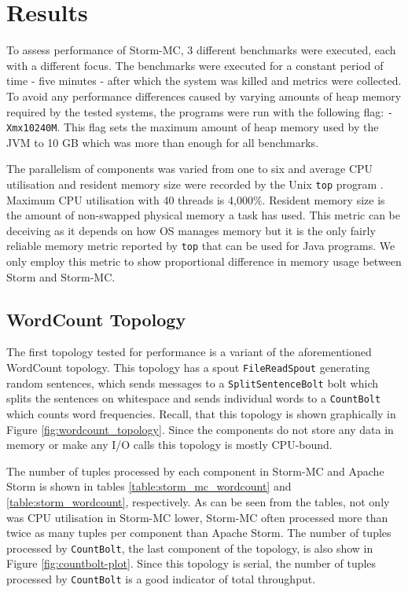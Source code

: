 \documentclass[bsc,logo,frontabs,twoside,singlespacing,normalheadings,parskip]{infthesis}\usepackage[]{graphicx}\usepackage[]{color}
\begin{document}
\section{Results}
\label{sec:performance}

To assess performance of Storm-MC, 3 different benchmarks were executed, each with a different focus. The benchmarks were executed for a constant period of time - five minutes - after which the system was killed and metrics were collected. To avoid any performance differences caused by varying amounts of heap memory required by the tested systems, the programs were run with the following flag: \texttt{-Xmx10240M}. This flag sets the maximum amount of heap memory used by the JVM to 10 GB which was more than enough for all benchmarks.

The parallelism of components was varied from one to six and average CPU utilisation and resident memory size were recorded by the Unix \texttt{top} program \citep{UnixTop}. Maximum CPU utilisation with 40 threads is 4,000\%. Resident memory size is the amount of non-swapped physical memory a task has used. This metric can be deceiving as it depends on how OS manages memory but it is the only fairly reliable memory metric reported by \texttt{top} that can be used for Java programs. We only employ this metric to show proportional difference in memory usage between Storm and Storm-MC.

\subsection{WordCount Topology}

The first topology tested for performance is a variant of the aforementioned WordCount topology. This topology has a spout \texttt{FileReadSpout} generating random sentences, which sends messages to a \texttt{SplitSentenceBolt} bolt which splits the sentences on whitespace and sends individual words to a \texttt{CountBolt} which counts word frequencies. Recall, that this topology is shown graphically in Figure \ref{fig:wordcount_topology}. Since the components do not store any data in memory or make any I/O calls this topology is mostly CPU-bound.

The number of tuples processed by each component in Storm-MC and Apache Storm is shown in tables \ref{table:storm_mc_wordcount} and \ref{table:storm_wordcount}, respectively. As can be seen from the tables, not only was CPU utilisation in Storm-MC lower, Storm-MC often processed more than twice as many tuples per component than Apache Storm.  The number of tuples processed by \texttt{CountBolt}, the last component of the topology, is also show in Figure \ref{fig:countbolt-plot}. Since this topology is serial, the number of tuples processed by \texttt{CountBolt} is a good indicator of total throughput.
\end{document}
